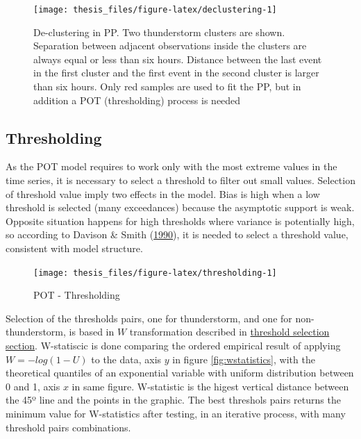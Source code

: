 \documentclass[12pt,oneside]{reedthesis}
\begin{document}
\footnotesize
\begin{figure}

{\centering \texttt{[image: thesis\_files/figure-latex/declustering-1]} 

}

\caption{De-clustering in PP. Two thunderstorm clusters are shown. Separation between adjacent observations inside the clusters are always equal or less than six hours. Distance between the last event in the first cluster and the first event in the second cluster is larger than six hours. Only red samples are used to fit the PP, but in addition a POT (thresholding) process is needed}\label{fig:declustering}
\end{figure}
\normalsize

\hypertarget{thresholding}{%
\subsection{Thresholding}\label{thresholding}}

As the POT model requires to work only with the most extreme values in the time series, it is necessary to select a threshold to filter out small values. Selection of threshold value imply two effects in the model. Bias is high when a low threshold is selected (many exceedances) because the asymptotic support is weak. Opposite situation happens for high thresholds where variance is potentially high, so according to Davison \& Smith (\protect\hyperlink{ref-Davison1990}{1990}), it is needed to select a threshold value, consistent with model structure.

\footnotesize
\begin{figure}

{\centering \texttt{[image: thesis\_files/figure-latex/thresholding-1]} 

}

\caption{POT - Thresholding}\label{fig:thresholding}
\end{figure}
\normalsize

Selection of the thresholds pairs, one for thunderstorm, and one for non-thunderstorm, is based in \(W\) transformation described in \protect\hyperlink{thresholdselection}{threshold selection section}. W-statiscic is done comparing the ordered empirical result of applying \(W = -log(1-U)\) to the data, axis \(y\) in figure \ref{fig:wstatistics}, with the theoretical quantiles of an exponential variable with uniform distribution between 0 and 1, axis \(x\) in same figure. W-statistic is the higest vertical distance between the 45º line and the points in the graphic. The best threshols pairs returns the minimum value for W-statistics after testing, in an iterative process, with many threshold pairs combinations.
\end{document}
